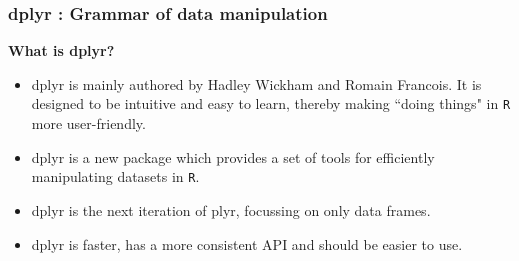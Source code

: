 \documentclass{beamer}
\begin{document}
	
	
	\begin{frame}[fragile]
		\frametitle{dplyr : Grammar of data manipulation}
		\textbf{What is dplyr?}
		\begin{itemize}
			\item dplyr is mainly authored by Hadley Wickham and Romain Francois. It is designed to be intuitive and easy to learn, thereby making ``doing things" in \texttt{R} more user-friendly.
			\item dplyr is a new package which provides a set of tools for efficiently manipulating datasets in \texttt{R}.
			\item dplyr is the next iteration of plyr, focussing on only data frames. \item dplyr is faster, has a more consistent API and should be easier to use. 
		\end{itemize}
	\end{frame}
	
\end{document}
